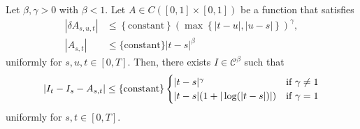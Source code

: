 \begin{theorem}
  Let \( \beta, \gamma > 0 \) with \( \beta < 1 \). Let \( A \in C([0,1] \times [0,1]) \) be a function that satisfies 
  \begin{align*}
    |\delta A_{s,u,t}| &\leq \left\{ \mathrm{constant} \right\} (\max\left\{  |t-u|, |u-s|\right\})^\gamma,\\
    |A_{s,t}| &\leq \{ \mathrm{constant} \} |t-s|^\beta
  \end{align*}
  uniformly for \( s,u,t \in [0,T] \). Then, there exists \( I \in \mathcal{C}^\beta \) such that 
  \begin{align*}
    |I_t - I_s -A_{s,t}| \leq \left\{ \mathrm{constant} \right\} \begin{cases}
      |t-s|^\gamma \quad & \text{if \( \gamma \neq 1 \)}\\
      |t-s|(1 + |\log(|t - s|)|) &\text{if \( \gamma = 1 \)}
    \end{cases}
  \end{align*}
  uniformly for \( s,t \in [0,T] \).
\end{theorem}